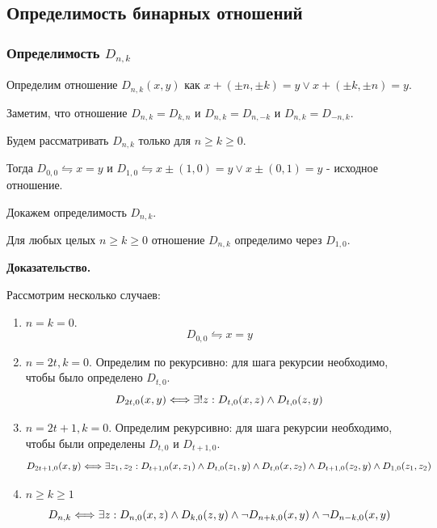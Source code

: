 \subsection{Определимость бинарных отношений}
\subsubsection{Определимость $D_{n,k}$}

Определим отношение $D_{n,k}(x,y)$ как $x + (\pm n, \pm k) = y \vee x + (\pm k, \pm n) = y$.

Заметим, что отношение $D_{n,k} = D_{k,n}$ и $D_{n,k} = D_{n,-k}$ и $D_{n,k} = D_{-n,k}$.

Будем рассматривать $D_{n,k}$ только для $n \ge k \ge 0$.

Тогда $D_{0,0} \leftrightharpoons x = y$ и $D_{1,0} \leftrightharpoons x \pm (1,0) = y \vee x \pm (0,1) = y$ - исходное отношение.

Докажем определимость $D_{n,k}$.

\begin{theorem}
    Для любых целых $n \ge k \ge 0$ отношение $D_{n,k}$ определимо через $D_{1,0}$.
\end{theorem}

\textbf{Доказательство.} 

Рассмотрим несколько случаев:

\begin{enumerate}
    \item $n = k = 0$.
        $$D_{0,0} \leftrightharpoons x = y$$

    \item $n = 2t, k = 0$.
        Определим по рекурсивно: для шага рекурсии необходимо, чтобы было определено $D_{t,0}$.
        $$D_{2t,0}(x,y) \Longleftrightarrow \exists! z : D_{t,0}(x, z) \wedge D_{t,0}(z, y)$$

    \item $n = 2t + 1, k = 0$.
        Определим рекурсивно: для шага рекурсии необходимо, чтобы были определены $D_{t,0}$ и $D_{t+1,0}$.
        $$D_{2t + 1,0}(x,y) \Longleftrightarrow \exists z_1, z_2 : D_{t + 1, 0}(x, z_1) \wedge D_{t,0}(z_1, y) \wedge D_{t,0}(x, z_2) \wedge D_{t+1, 0}(z_2, y) \wedge D_{1, 0} (z_1, z_2)$$


    \item $n \ge k \ge 1$
        $$D_{n,k} \Longleftrightarrow \exists z: D_{n, 0}(x, z) \wedge D_{k, 0}(z, y) \wedge \lnot D_{n+k, 0}(x,y) \wedge \lnot D_{n-k, 0}(x,y)$$
\end{enumerate}